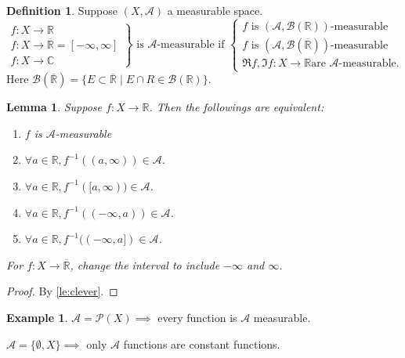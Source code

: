 \documentclass{report}
\newcommand{\R}{\mathbb{R}}
\newcommand{\C}{\mathbb{C}}
\newtheorem{lemma}[theorem]{Lemma}
\theoremstyle{definition}
\newtheorem{definition}[theorem]{Definition}
\newtheorem{example}[theorem]{Example}
\theoremstyle{remark}
\begin{document}
\begin{definition}
	Suppose $(X, \mathcal{A})$ a measurable space.
	\[
	\left.\begin{array}{l}
		f: X \to \R \\
		f: X \to \overline{\R} = [-\infty, \infty] \\
		f: X \to \C
	\end{array}	\right\rbrace \text{ is $\mathcal{A}$-measurable if }
	\left\lbrace\begin{array}{l}
		f \text{ is $(\mathcal{A}, \mathcal{B}(\R))$-measurable} \\
		f \text{ is $(\mathcal{A}, \mathcal{B}(\overline{\R}))$-measurable} \\
		\Re f, \Im f: X \to \R \text{are $\mathcal{A}$-measurable.}
	\end{array}\right.
	\]
	Here $\mathcal{B}(\overline{\R}) = \{E \subset \overline{\R} \mid E \cap R \in \mathcal{B}(\R)\}$.
\end{definition}

\begin{lemma}
	Suppose $f: X \to \R$. Then the followings are equivalent:
	\begin{enumerate}
		\item $f$ is $\mathcal{A}$-measurable
		\item $\forall a \in \R, f^{-1}((a, \infty)) \in \mathcal{A}$.
		\item $\forall a \in \R, f^{-1}([a, \infty)) \in \mathcal{A}$.
		\item $\forall a \in \R, f^{-1}((-\infty, a)) \in \mathcal{A}$.
		\item $\forall a \in \R, f^{-1}((-\infty, a]) \in \mathcal{A}$.
	\end{enumerate}
	For $f: X \to \overline{\R}$, change the interval to include $-\infty$ and $\infty$.
\end{lemma}
\begin{proof}
	By \ref{le:clever}.
\end{proof}



\begin{example}
	$\mathcal{A} = \mathcal{P}(X) \implies$ every function is $\mathcal{A}$ measurable.

	$\mathcal{A} = \{\emptyset, X\} \implies$ only $\mathcal{A}$ functions are constant functions.
\end{example}
\end{document}

